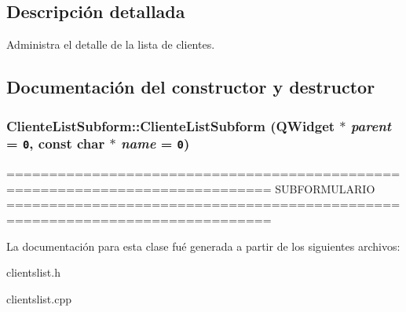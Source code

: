 \subsection{Descripci\'{o}n detallada}
Administra el detalle de la lista de clientes. 



\subsection{Documentaci\'{o}n del constructor y destructor}
\subsubsection{\setlength{\rightskip}{0pt plus 5cm}Cliente\-List\-Subform::Cliente\-List\-Subform (QWidget $\ast$ {\em parent} = {\tt 0}, const char $\ast$ {\em name} = {\tt 0})}\label{classClienteListSubform_a0}


============================================================================= SUBFORMULARIO ============================================================================= 

La documentaci\'{o}n para esta clase fu\'{e} generada a partir de los siguientes archivos:\begin{CompactItemize}
\item 
clientslist.h\item 
clientslist.cpp\end{CompactItemize}
